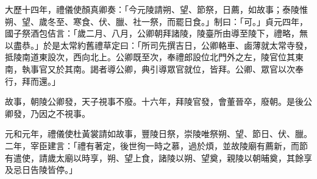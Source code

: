 \begin{pinyinscope}
 大歷十四年，禮儀使顏真卿奏：「今元陵請朔、望、節祭，日薦，如故事；泰陵惟朔、望、歲冬至、寒食、伏、臘、社一祭，而罷日食。」制曰：「可。」貞元四年，國子祭酒包佶言：「歲二月、八月，公卿朝拜諸陵，陵臺所由導至陵下，禮略，無以盡恭。」於是太常約舊禮草定曰：「所司先撰吉日，公卿輅車、鹵薄就太常寺發，抵陵南道東設次，西向北上。公卿既至次，奉禮郎設位北門外之左，陵官位其東南，執事官又於其南。謁者導公卿，典引導眾官就位，皆拜。公卿、眾官以次奉行，拜而還。」



 故事，朝陵公卿發，天子視事不廢。十六年，拜陵官發，會董晉卒，廢朝。是後公卿發，乃因之不視事。



 元和元年，禮儀使杜黃裳請如故事，豐陵日祭，崇陵唯祭朔、望、節日、伏、臘。二年，宰臣建言：「禮有著定，後世徇一時之慕，過於煩，並故陵廟有薦新，而節有遣使，請歲太廟以時享，朔、望上食，諸陵以朔、望奠，親陵以朝晡奠，其餘享及忌日告陵皆停。」



\end{pinyinscope}